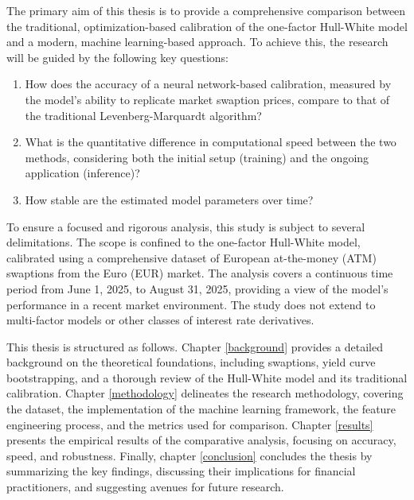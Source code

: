 The primary aim of this thesis is to provide a comprehensive comparison between the traditional, optimization-based calibration of the one-factor Hull-White model and a modern, machine learning-based approach. To achieve this, the research will be guided by the following key questions:
\begin{enumerate}
	\item How does the accuracy of a neural network-based calibration, measured by the model's ability to replicate market swaption prices, compare to that of the traditional Levenberg-Marquardt algorithm?
	\item What is the quantitative difference in computational speed between the two methods, considering both the initial setup (training) and the ongoing application (inference)?
	\item How stable are the estimated model parameters over time?
\end{enumerate}

To ensure a focused and rigorous analysis, this study is subject to several delimitations. The scope is confined to the one-factor Hull-White model, calibrated using a comprehensive dataset of European at-the-money (ATM) swaptions from the Euro (EUR) market. The analysis covers a continuous time period from June 1, 2025, to August 31, 2025, providing a view of the model's performance in a recent market environment. The study does not extend to multi-factor models or other classes of interest rate derivatives.

This thesis is structured as follows. Chapter \ref{background} provides a detailed background on the theoretical foundations, including swaptions, yield curve bootstrapping, and a thorough review of the Hull-White model and its traditional calibration. Chapter \ref{methodology} delineates the research methodology, covering the dataset, the implementation of the machine learning framework, the feature engineering process, and the metrics used for comparison. Chapter \ref{results} presents the empirical results of the comparative analysis, focusing on accuracy, speed, and robustness. Finally, chapter \ref{conclusion} concludes the thesis by summarizing the key findings, discussing their implications for financial practitioners, and suggesting avenues for future research.